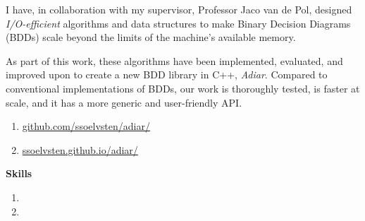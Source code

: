
I have, in collaboration with my supervisor, Professor Jaco van de Pol, designed
\emph{I/O-efficient} algorithms and data structures to make Binary Decision Diagrams (BDDs) scale
beyond the limits of the machine's available memory.

\medskip

As part of this work, these algorithms have been implemented, evaluated, and improved upon to create
a new BDD library in C++, \emph{Adiar}. Compared to conventional implementations of BDDs, our work
is thoroughly tested, is faster at scale, and it has a more generic and user-friendly API.

\medskip

\begin{enumerate}[leftmargin=2.5em]
\item[\indent\faGit] \href{https://github.com/ssoelvsten/adiar/}{github.com/ssoelvsten/adiar/}

\item[\indent\faFileTextO] \href{https://ssoelvsten.github.io/adiar/}{ssoelvsten.github.io/adiar/}
\end{enumerate}

\medskip
{\color{accent} \textbf{Skills}}
\smallskip

\begin{enumerate}[leftmargin=2.5em] \small
\item[\indent\faWrench]   
\item[\indent\faLightbulbO]  
\end{enumerate}
